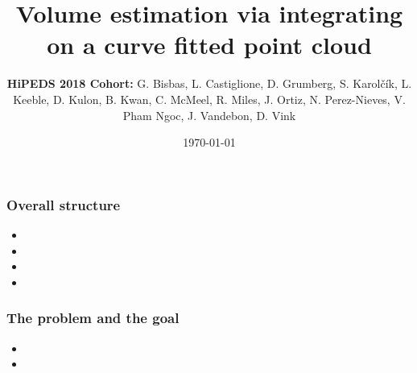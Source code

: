 \documentclass{beamer}
\title[Short title]{Volume estimation via integrating on a curve fitted point cloud} %
\author{\textbf{HiPEDS 2018 Cohort:} G. Bisbas, L. Castiglione, D. Grumberg, S. Karolčík, L. Keeble, D. Kulon, B. Kwan, C. McMeel, R. Miles, J. Ortiz, N. Perez-Nieves, V. Pham Ngoc, J. Vandebon, D. Vink} %
\institute[Imperial College London] %
{ Imperial College London \\ %
\medskip %
}
\date{\today} %
\begin{document}
\begin{frame}
\titlepage %
\end{frame}




\begin{frame}
\frametitle{Overall structure}

\begin{itemize}
	\item  
	\item 
	\item 
	\item 
	

	
	
\end{itemize}

\end{frame}


\begin{frame}
\frametitle{The problem and the goal} 

\begin{itemize}
	\item
	
	\item 
	
\end{itemize}

\end{frame}
\end{document}
